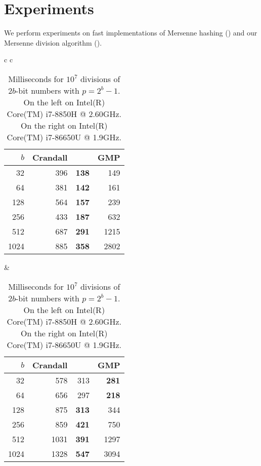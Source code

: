 \section{Experiments}
We perform experiments on fast implementations of Mersenne hashing () and our Mersenne division algorithm ().



\begin{table}[H]
   \centering
   \begin{tabular}{ c c }
      \begin{tabular}{ r | r r r }
         $b$ & Crandall & \Cref{alg:division-generalized} & GMP \\
         \hline
         32 & 396 & \textbf   {138}  & 149\\
         64 & 381 &   \textbf {142}  & 161\\
         128 & 564 &  \textbf {157}  & 239\\
         256 & 433 &  \textbf {187}  & 632\\
         512 & 687 &  \textbf {291}  & 1215\\
         1024 & 885 & \textbf {358}  & 2802
      \end{tabular}
      \hspace{.5em}
      &
      \hspace{.5em}
      \begin{tabular}{ r | r r r }
         $b$ & Crandall & \Cref{alg:division-generalized} & GMP \\
         \hline
         32 & 578 & 313 & \textbf {281}\\
         64 & 656 & 297 & \textbf {218}\\
         128 & 875 & \textbf      {313} & 344\\
         256 & 859 & \textbf      {421} & 750\\
         512 & 1031 & \textbf     {391} & 1297\\
         1024 & 1328 & \textbf    {547} & 3094\\

      \end{tabular}
   \end{tabular}
   \caption{Milliseconds for $10^7$ divisions of $2b$-bit numbers with $p=2^b-1$.
         On the left on Intel(R) Core(TM) i7-8850H @ 2.60GHz.
      On the right on Intel(R) Core(TM) i7-86650U @ 1.9GHz.
   }
\end{table}
